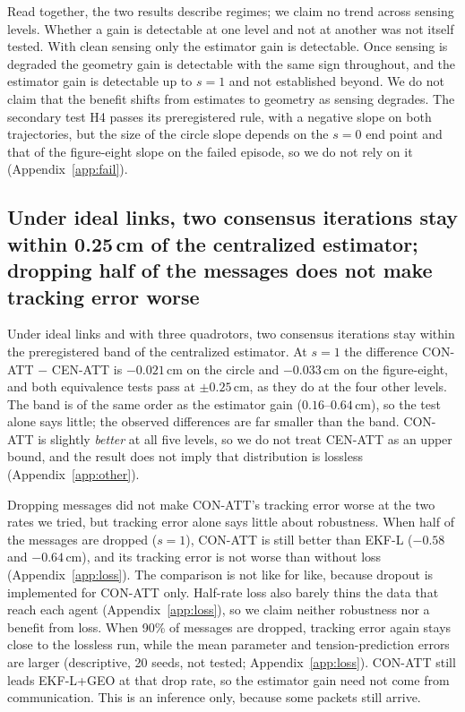 \documentclass[conference]{IEEEtran}
\begin{document}
Read together, the two results describe regimes; we claim no trend across sensing levels. Whether a gain is detectable at one level and not at another was not itself tested. With clean sensing only the estimator gain is detectable. Once sensing is degraded the geometry gain is detectable with the same sign throughout, and the estimator gain is detectable up to $s=1$ and not established beyond. We do not claim that the benefit shifts from estimates to geometry as sensing degrades. The secondary test H4 passes its preregistered rule, with a negative slope on both trajectories, but the size of the circle slope depends on the $s{=}0$ end point and that of the figure-eight slope on the failed episode, so we do not rely on it (Appendix~\ref{app:fail}).

\subsection{Under ideal links, two consensus iterations stay within 0.25\,cm of the centralized estimator; dropping half of the messages does not make tracking error worse}
Under ideal links and with three quadrotors, two consensus iterations stay within the preregistered band of the centralized estimator. At $s=1$ the difference CON-ATT $-$ CEN-ATT is $-0.021$\,cm on the circle and $-0.033$\,cm on the figure-eight, and both equivalence tests pass at $\pm0.25$\,cm, as they do at the four other levels. The band is of the same order as the estimator gain ($0.16$--$0.64$\,cm), so the test alone says little; the observed differences are far smaller than the band. CON-ATT is slightly \emph{better} at all five levels, so we do not treat CEN-ATT as an upper bound, and the result does not imply that distribution is lossless (Appendix~\ref{app:other}).

Dropping messages did not make CON-ATT's tracking error worse at the two rates we tried, but tracking error alone says little about robustness. When half of the messages are dropped ($s{=}1$), CON-ATT is still better than EKF-L ($-0.58$ and $-0.64$\,cm), and its tracking error is not worse than without loss (Appendix~\ref{app:loss}). The comparison is not like for like, because dropout is implemented for CON-ATT only. Half-rate loss also barely thins the data that reach each agent (Appendix~\ref{app:loss}), so we claim neither robustness nor a benefit from loss. When 90\% of messages are dropped, tracking error again stays close to the lossless run, while the mean parameter and tension-prediction errors are larger (descriptive, 20 seeds, not tested; Appendix~\ref{app:loss}). CON-ATT still leads EKF-L+GEO at that drop rate, so the estimator gain need not come from communication. This is an inference only, because some packets still arrive.
\end{document}
